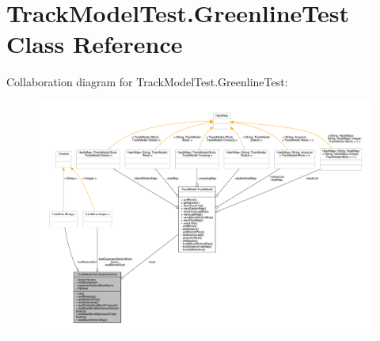 \hypertarget{classTrackModelTest_1_1GreenlineTest}{}\section{Track\+Model\+Test.\+Greenline\+Test Class Reference}
\label{classTrackModelTest_1_1GreenlineTest}


Collaboration diagram for Track\+Model\+Test.\+Greenline\+Test\+:
\nopagebreak
\begin{figure}[H]
\begin{center}
\leavevmode
\includegraphics[width=350pt]{classTrackModelTest_1_1GreenlineTest__coll__graph}
\end{center}
\end{figure}
